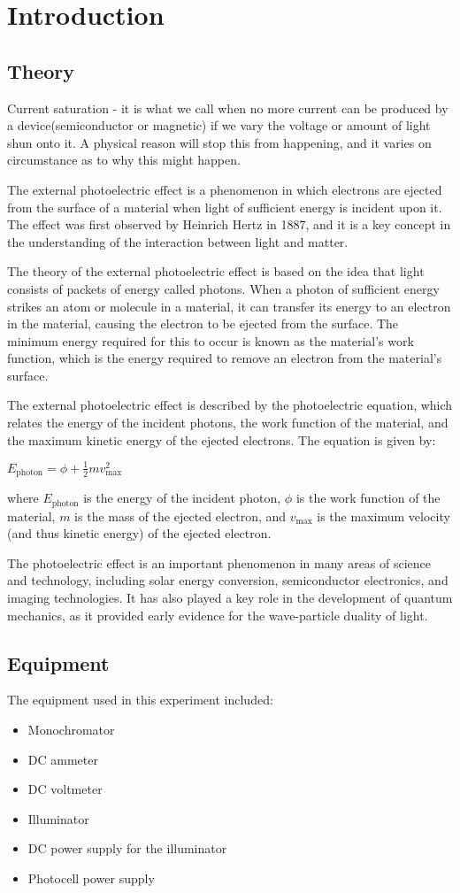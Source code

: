 \section{Introduction}

\subsection{Theory}
 Current saturation - it is what we call when no more current can be produced by a device(semiconductor or magnetic) if we vary the voltage or amount of light shun onto it. A physical reason will stop this from happening, and it varies on circumstance as to why this might happen.
 
 The external photoelectric effect is a phenomenon in which electrons are ejected from the surface of a material when light of sufficient energy is incident upon it. The effect was first observed by Heinrich Hertz in 1887, and it is a key concept in the understanding of the interaction between light and matter.

The theory of the external photoelectric effect is based on the idea that light consists of packets of energy called photons. When a photon of sufficient energy strikes an atom or molecule in a material, it can transfer its energy to an electron in the material, causing the electron to be ejected from the surface. The minimum energy required for this to occur is known as the material's work function, which is the energy required to remove an electron from the material's surface.

The external photoelectric effect is described by the photoelectric equation, which relates the energy of the incident photons, the work function of the material, and the maximum kinetic energy of the ejected electrons. The equation is given by:

$E_{\text{photon}} = \phi + \frac{1}{2}mv_{\text{max}}^2$

where $E_{\text{photon}}$ is the energy of the incident photon, $\phi$ is the work function of the material, $m$ is the mass of the ejected electron, and $v_{\text{max}}$ is the maximum velocity (and thus kinetic energy) of the ejected electron.

The photoelectric effect is an important phenomenon in many areas of science and technology, including solar energy conversion, semiconductor electronics, and imaging technologies. It has also played a key role in the development of quantum mechanics, as it provided early evidence for the wave-particle duality of light.

\subsection{Equipment}
The equipment used in this experiment included:
\begin{itemize}
	\item Monochromator
	\item DC ammeter 
	\item DC voltmeter 
	\item Illuminator
	\item DC power supply for the illuminator
	\item Photocell power supply
\end{itemize}



